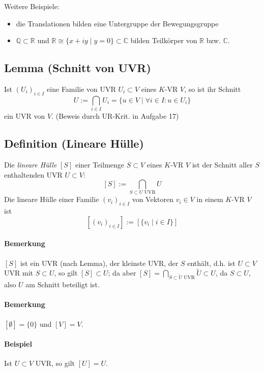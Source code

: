         Weitere Beispiele:
        \begin{itemize}
            \item die Translationen bilden eine Untergruppe der Bewegungsgruppe
            \item $\mathbb{Q}\subset\mathbb{R}$ und $\mathbb{R}\cong \{x+iy\mid y=0\}\subset\mathbb{C}$ bilden Teilkörper von $\mathbb{R}$ bzw. $\mathbb{C}$.
        \end{itemize}

\subsection{Lemma (Schnitt von UVR)}
    \begin{Lemma}
    	Ist $(U_i)_{i\in I}$ eine Familie von UVR $U_i\subset V$ eines $K$-VR $V$, so ist ihr Schnitt
        \[ U:= \bigcap_{i\in I}U_i =\{ u\in V\mid \forall i\in I: u\in U_i\} \]
	ein UVR von $V$. (Beweis durch UR-Krit. in Aufgabe 17)
    \end{Lemma}
    
\subsection{Definition (Lineare Hülle)}
	\begin{Definition}
		Die \emph{lineare Hülle} $[S]$ einer Teilmenge $S\subset V$ eines $ K $-VR $ V $ ist der Schnitt aller $S$ enthaltenden UVR $U\subset V$:
		\[ [S] := \bigcap_{S\subset U \text{ UVR}} U \]
	Die lineare Hülle einer Familie $(v_i)_{i\in I}$ von Vektoren $v_i\in V$ in einem $ K $-VR $ V $ ist
		\[ [(v_i)_{i\in I}] := [\{v_i\mid i\in I\}] \]
	\end{Definition}

\paragraph{Bemerkung}
    $[S]$ ist ein UVR (nach Lemma), der \glqq kleinste\grqq{} UVR, der $S$ enthält, d.h. ist $U\subset V$ UVR mit $S\subset U$, so gilt $[S]\subset U$; da aber $[S] = \bigcap_{S\subset \tilde{U}  \text{ UVR}}\tilde{U}\subset U$,
    da $S\subset U$, also $U$ am Schnitt beteiligt ist.

\paragraph{Bemerkung}
	$[\emptyset ] = \{0\}$ und $[V] = V$.

\paragraph{Beispiel}
	Ist $U\subset V$ UVR, so gilt $[U] = U$.

